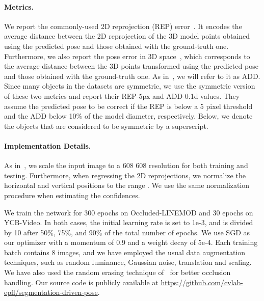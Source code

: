 \documentclass[10pt,twocolumn,letterpaper]{article}
\newcommand{\parag}[1]{\vspace{-3mm}\paragraph{#1}}
\begin{document}
\parag{Metrics.}


We report the commonly-used 2D reprojection (REP) error~\cite{Brachmann16a}. It encodes the average distance between the 2D reprojection of the 3D model points obtained using the predicted pose and those obtained with the ground-truth one. Furthermore, we also report the pose error in 3D space~\cite{Hinterstoisser12b}, which corresponds to the average distance between the 3D points transformed using the predicted pose and those obtained with the ground-truth one. As in~\cite{Li18a, Xiang18b}, we will refer to it as ADD. Since many objects in the datasets are symmetric,  we use the symmetric version of these two metrics and report their REP-5px and ADD-0.1d values. They assume the predicted pose to be correct if the REP is below a 5 pixel threshold and the ADD below 10\% of the model diameter, respectively. Below, we denote the objects that are considered to be symmetric by a  superscript. 

\parag{Implementation Details.}
As in~\cite{Redmon18}, we scale the input image to a 608  608 resolution for both training and testing. Furthermore, when regressing the 2D reprojections, we normalize the horizontal and vertical positions to the range . We use the same normalization procedure when estimating the confidences.

We train the network for 300 epochs on Occluded-LINEMOD and 30 epochs on YCB-Video. In both cases, the initial learning rate is set to 1e-3, and is divided by 10 after 50\%, 75\%, and 90\% of the total number of epochs. We use SGD as our optimizer with a momentum of 0.9 and a weight decay of 5e-4. Each training batch contains 8 images, and we have employed the usual data augmentation techniques, such as random luminance, Gaussian noise, translation and scaling. We have also used the random erasing technique of~\cite{Zhong17} for better occlusion handling. Our source code is publicly available at \href{https://github.com/cvlab-epfl/segmentation-driven-pose}{https://github.com/cvlab-epfl/segmentation-driven-pose}.
\end{document}
